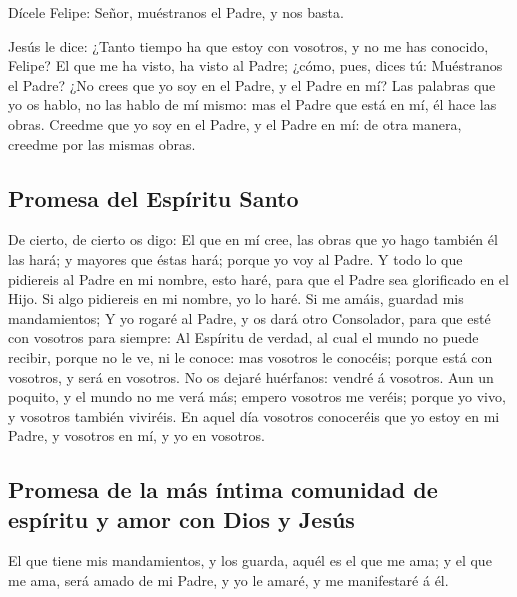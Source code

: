 Dícele Felipe: Señor, muéstranos el Padre, y nos basta.

 Jesús le dice: ¿Tanto tiempo ha que estoy con vosotros, y
no me has conocido, Felipe? El que me ha visto, ha visto al Padre;
¿cómo, pues, dices tú: Muéstranos el Padre?  ¿No crees
que yo soy en el Padre, y el Padre en mí? Las palabras que yo os hablo,
no las hablo de mí mismo: mas el Padre que está en mí, él hace las
obras.  Creedme que yo soy en el Padre, y el Padre en mí:
de otra manera, creedme por las mismas obras.

\hypertarget{promesa-del-espuxedritu-santo}{%
\subsection{Promesa del Espíritu
Santo}\label{promesa-del-espuxedritu-santo}}

 De cierto, de cierto os digo: El que en mí cree, las
obras que yo hago también él las hará; y mayores que éstas hará; porque
yo voy al Padre.  Y todo lo que pidiereis al Padre en mi
nombre, esto haré, para que el Padre sea glorificado en el Hijo.
 Si algo pidiereis en mi nombre, yo lo haré.
 Si me amáis, guardad mis mandamientos;  Y
yo rogaré al Padre, y os dará otro Consolador, para que esté con
vosotros para siempre:  Al Espíritu de verdad, al cual el
mundo no puede recibir, porque no le ve, ni le conoce: mas vosotros le
conocéis; porque está con vosotros, y será en vosotros. 
No os dejaré huérfanos: vendré á vosotros.  Aun un
poquito, y el mundo no me verá más; empero vosotros me veréis; porque yo
vivo, y vosotros también viviréis.  En aquel día vosotros
conoceréis que yo estoy en mi Padre, y vosotros en mí, y yo en vosotros.

\hypertarget{promesa-de-la-muxe1s-uxedntima-comunidad-de-espuxedritu-y-amor-con-dios-y-jesuxfas}{%
\subsection{Promesa de la más íntima comunidad de espíritu y amor con
Dios y
Jesús}\label{promesa-de-la-muxe1s-uxedntima-comunidad-de-espuxedritu-y-amor-con-dios-y-jesuxfas}}

 El que tiene mis mandamientos, y los guarda, aquél es el
que me ama; y el que me ama, será amado de mi Padre, y yo le amaré, y me
manifestaré á él.

